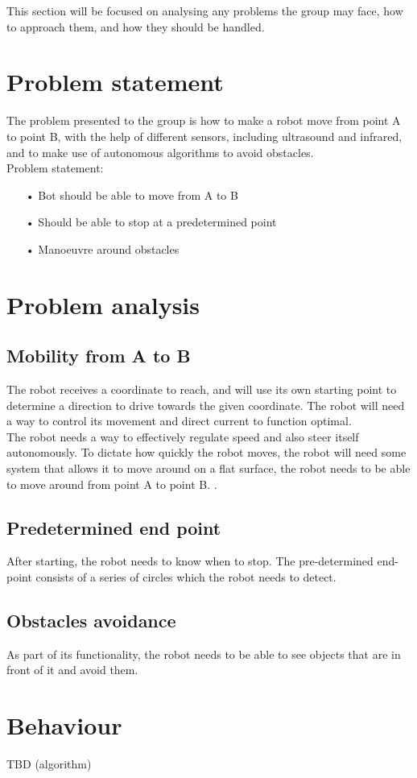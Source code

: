 This section will be focused on analysing any problems the group may face, how to approach them, and how they should be handled.

\section{Problem statement}

The problem presented to the group is how to make a robot move from point A to point B, with the help of different sensors, including ultrasound and infrared, and to make use of autonomous algorithms to avoid obstacles. \\

Problem statement:
\begin{enumerate}
\item[•]Bot should be able to move from A to B
\item[•]Should be able to stop at a predetermined point
\item[•]Manoeuvre around obstacles
\end{enumerate}

\section{Problem analysis}
\subsection{Mobility from A to B}
The robot receives a coordinate to reach, and will use its own starting point to determine a direction to drive towards the given coordinate. The robot will need a way to control its movement and direct current to function optimal.\\
The robot needs a way to effectively regulate speed and also steer itself autonomously. To dictate how quickly the robot moves, the robot will need some system that allows it to move around on a flat surface, the robot needs to be able to move around from point A to point B.
.\

\subsection{Predetermined end point}
After starting, the robot needs to know when to stop. The pre-determined end-point consists of a series of circles which the robot needs to detect. 

\subsection{Obstacles avoidance}
As part of its functionality, the robot needs to be able to see objects that are in front of it and avoid them. 

\section{Behaviour}
TBD (algorithm)